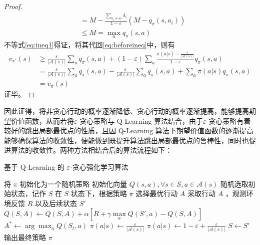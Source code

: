 \begin{proof}
\[\begin{aligned}
            &=M-\frac{\sum_{a_i\neq a_*}\delta_i}{1-\varepsilon}(M-q_\pi(s,a_i))\\
            &\leq M=\max\limits_aq_\pi(s,a)
            \end{aligned}
    \]
    不等式\ref{eq:ineq1}得证，将其代回\ref{eq:beforeineq}中，则有
    \[
        \begin{aligned}
            v_{\pi'}(s)&\geq\frac{\varepsilon}{|\mathcal A(s)|}\sum_aq_\pi(s,a)+(1-\varepsilon)\sum_a\frac{\pi(a|s)-\frac{\varepsilon}{|\mathcal A(s)|}}{1-\varepsilon}q_\pi(s,a)\\
            &=\frac{\varepsilon}{|\mathcal A(s)|}\sum_aq_\pi(s,a)-\frac{\varepsilon}{|\mathcal A(s)|}\sum_aq_\pi(s,a)+\sum_a\pi(a|s)q_\pi(s,a)\\
            &=v_\pi(s)
            \end{aligned}
    \]
    证毕。
\end{proof}

因此证得，将非贪心行动的概率逐渐降低、贪心行动的概率逐渐提高，能够提高期望价值函数，从而若将$\varepsilon$-贪心策略与 Q-Learning 算法结合，由于$\varepsilon$-贪心策略有着较好的跳出局部最优点的性质，且因 Q-Learning 算法下期望价值函数的逐渐提高能够确保算法的收敛性，便能做到既提升算法跳出局部最优点的鲁棒性，同时也促进算法的收敛性。两种方法相结合后的算法流程如下：

\begin{algorithm}[H]
    \caption{基于 Q-Learning 的 $\varepsilon$-贪心强化学习算法}
    \begin{algorithmic}[1] %
        \State 将 $\pi$ 初始化为一个随机策略
        \State 初始化向量 $Q(s,a), \forall s\in \mathcal S,a\in \mathcal{A}(s)$
        \Loop
        \State 随机选取初始状态，记作 $S$
        \Repeat
        \State 在 $S$ 状态下，根据策略 $\pi$ 选择最优行动 $A$
        \State 采取行动 $A$ ，观测环境反馈 $R$ 以及后续状态 $S'$
        \State $Q(S,A)\leftarrow Q(S,A)+\alpha\left[R+\gamma  \max\limits_aQ(S',a)-Q(S,A)\right]$
        \State $A^*\leftarrow\arg\max_aQ(S_t,a)$
        \State $\pi(a|s)\leftarrow \frac{\varepsilon}{|\mathcal A(s)|}$
        \Else
        \State $\pi(a|s)\leftarrow 1-\varepsilon+\frac{\varepsilon}{|\mathcal A(s)|}$
        \EndIf
        \EndFor
        \State $S\leftarrow S'$
        \EndLoop
        \State
        \State 输出最终策略 $\pi$
    \end{algorithmic}
\end{algorithm}

